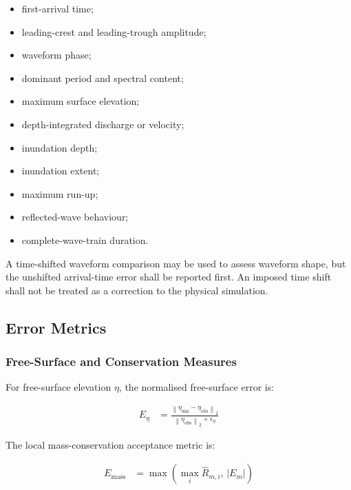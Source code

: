 \begin{itemize}
  \item first-arrival time;
  \item leading-crest and leading-trough amplitude;
  \item waveform phase;
  \item dominant period and spectral content;
  \item maximum surface elevation;
  \item depth-integrated discharge or velocity;
  \item inundation depth;
  \item inundation extent;
  \item maximum run-up;
  \item reflected-wave behaviour;
  \item complete-wave-train duration.
\end{itemize}

A time-shifted waveform comparison may be used to assess waveform
shape, but the unshifted arrival-time error shall be reported first.
An imposed time shift shall not be treated as a correction to the
physical simulation.

\subsection{Error Metrics}
\label{sec:res-ver-met-error-metrics}


\subsubsection{Free-Surface and Conservation Measures}
\label{sec:res-ver-met-free-surface-conservation-measures}

For free-surface elevation $\eta$, the normalised free-surface error is:

\begin{align}
  E_{\eta}
  &=
  \frac{
    \left\lVert
      \eta_{\mathrm{sim}}
      -
      \eta_{\mathrm{obs}}
    \right\rVert_{2}
  }{
    \left\lVert
      \eta_{\mathrm{obs}}
    \right\rVert_{2}
    +
    \epsilon_{\eta}
  }
  \label{eq:res-ver-met-free-surface-error}
\end{align}

The local mass-conservation acceptance metric is:

\begin{align}
  E_{\mathrm{mass}}
  &=
  \max
  \left(
    \max_i
    \widehat{R}_{m,i},\,
    \left|
      E_m
    \right|
  \right)
  \label{eq:res-ver-met-local-mass-acceptance}
\end{align}

